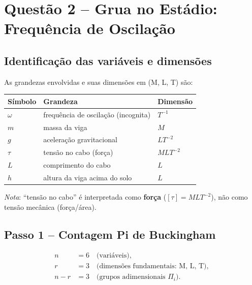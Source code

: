 \documentclass[12pt,a4paper]{article}
\theoremstyle{definition}
\begin{document}
\section{Quest\~ao 2 -- Grua no Est\'adio: Frequ\^encia de Oscila\c{c}\~ao}

\subsection{Identifica\c{c}\~ao das vari\'aveis e dimens\~oes}

As grandezas envolvidas e suas dimens\~oes em (M, L, T) s\~ao:

\begin{center}
\begin{tabular}{lll}
\toprule
\textbf{S\'imbolo} & \textbf{Grandeza} & \textbf{Dimens\~ao}\\
\midrule
$\omega$   & frequ\^encia de oscila\c{c}\~ao (incognita) & $T^{-1}$ \\
$m$        & massa da viga                                 & $M$ \\
$g$        & acelera\c{c}\~ao gravitacional                & $LT^{-2}$ \\
$\tau$     & tens\~ao no cabo (for\c{c}a)                  & $MLT^{-2}$ \\
$L$        & comprimento do cabo                           & $L$ \\
$h$        & altura da viga acima do solo                  & $L$ \\
\bottomrule
\end{tabular}
\end{center}

\noindent
\textit{Nota}: ``tens\~ao no cabo'' \'e interpretada como \textbf{for\c{c}a} ($[\tau] = MLT^{-2}$),
n\~ao como tens\~ao mec\^anica (for\c{c}a/\'area).

\subsection{Passo 1 -- Contagem Pi de Buckingham}

\begin{align}
  n &= 6 \quad \text{(vari\'aveis)}, \\
  r &= 3 \quad \text{(dimens\~oes fundamentais: M, L, T)}, \\
  n - r &= 3 \quad \text{(grupos adimensionais $\Pi_i$)}.
\end{align}
\end{document}
